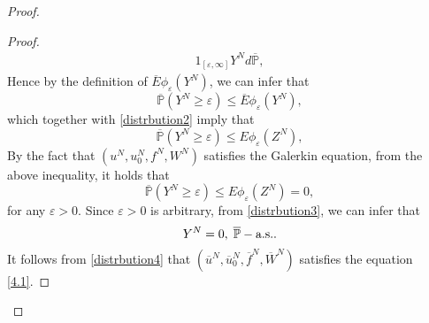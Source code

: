 \documentclass[reqno]{amsart}
\theoremstyle{definition}
\theoremstyle{remark}
\numberwithin{equation}{section} \allowdisplaybreaks
\begin{document}
\begin{proof}
\begin{proof}
\begin{equation*}
\begin{split}
1_{[\varepsilon,\infty]}Y^Nd\overline{\mathbb{P}},
\end{split}
\end{equation*}
Hence by the definition of $\overline{E}\phi_\varepsilon(Y^N)$, we
can infer that
\begin{equation*}
\overline{\mathbb{P}}(Y^N\ge \varepsilon)\le
\overline{E}\phi_\varepsilon(Y^N),
\end{equation*}
which together with \eqref{distrbution2} imply that
\begin{equation*}
\overline{\mathbb{P}}(Y^N\ge \varepsilon)\le E\phi_\varepsilon(Z^N),
\end{equation*}
By the fact that $(u^N,u^N_0,f^N,W^N)$ satisfies the Galerkin
equation, from the above inequality, it holds that
\begin{equation}\label{distrbution3}
\overline{\mathbb{P}}(Y^N\ge \varepsilon)\le
E\phi_\varepsilon(Z^N)=0,
\end{equation}
for any $\varepsilon>0$. Since $\varepsilon>0$ is arbitrary, from
\eqref{distrbution3}, we can infer that
\begin{equation}\label{distrbution4}
Y^N=0,\; \overline{\mathbb{P}}-\mbox{\rm a.s.}.
\end{equation}
It follows from \eqref{distrbution4} that
$(\overline{u}^N,\overline{u}^N_0,\overline{f}^N,\overline{W}^N)$
satisfies the equation \eqref{4.1}.
\end{proof}




\end{proof}
\end{document}
